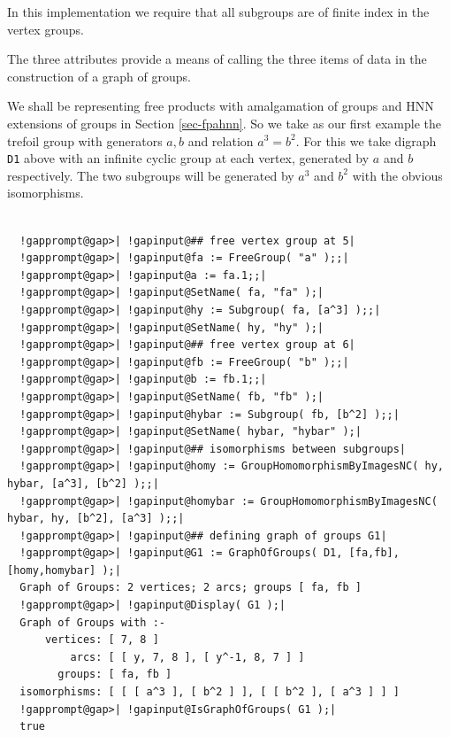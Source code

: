 \documentclass[a4paper,11pt]{report}
\begin{document}
{{{ In this implementation we require that all subgroups are of finite index in
the vertex groups. 

 The three attributes provide a means of calling the three items of data in the
construction of a graph of groups. 

 We shall be representing free products with amalgamation of groups and HNN
extensions of groups in Section \ref{sec-fpahnn}. So we take as our first example the trefoil group with generators $a,b$ and relation $a^3=b^2$. For this we take digraph \texttt{D1} above with an infinite cyclic group at each vertex, generated by $a$ and $b$ respectively. The two subgroups will be generated by $a^3$ and $b^2$ with the obvious isomorphisms. 

 }

 
\begin{Verbatim}[commandchars=!@|,fontsize=\small,frame=single,label=Example]
  
  !gapprompt@gap>| !gapinput@## free vertex group at 5|
  !gapprompt@gap>| !gapinput@fa := FreeGroup( "a" );;|
  !gapprompt@gap>| !gapinput@a := fa.1;;|
  !gapprompt@gap>| !gapinput@SetName( fa, "fa" );|
  !gapprompt@gap>| !gapinput@hy := Subgroup( fa, [a^3] );;|
  !gapprompt@gap>| !gapinput@SetName( hy, "hy" );|
  !gapprompt@gap>| !gapinput@## free vertex group at 6|
  !gapprompt@gap>| !gapinput@fb := FreeGroup( "b" );;|
  !gapprompt@gap>| !gapinput@b := fb.1;;|
  !gapprompt@gap>| !gapinput@SetName( fb, "fb" );|
  !gapprompt@gap>| !gapinput@hybar := Subgroup( fb, [b^2] );;|
  !gapprompt@gap>| !gapinput@SetName( hybar, "hybar" );|
  !gapprompt@gap>| !gapinput@## isomorphisms between subgroups|
  !gapprompt@gap>| !gapinput@homy := GroupHomomorphismByImagesNC( hy, hybar, [a^3], [b^2] );;|
  !gapprompt@gap>| !gapinput@homybar := GroupHomomorphismByImagesNC( hybar, hy, [b^2], [a^3] );;|
  !gapprompt@gap>| !gapinput@## defining graph of groups G1|
  !gapprompt@gap>| !gapinput@G1 := GraphOfGroups( D1, [fa,fb], [homy,homybar] );|
  Graph of Groups: 2 vertices; 2 arcs; groups [ fa, fb ]
  !gapprompt@gap>| !gapinput@Display( G1 );|
  Graph of Groups with :- 
      vertices: [ 7, 8 ]
          arcs: [ [ y, 7, 8 ], [ y^-1, 8, 7 ] ]
        groups: [ fa, fb ]
  isomorphisms: [ [ [ a^3 ], [ b^2 ] ], [ [ b^2 ], [ a^3 ] ] ]
  !gapprompt@gap>| !gapinput@IsGraphOfGroups( G1 );|
  true
  
\end{Verbatim}
 

}}
\end{document}
